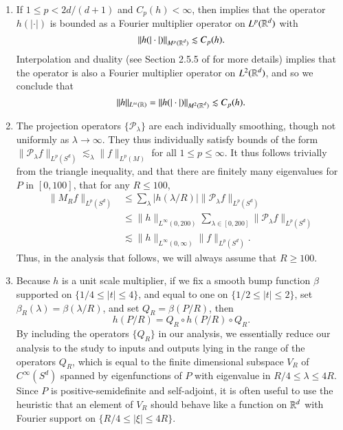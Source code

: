 \begin{remarks}
    \ 
\begin{enumerate}
    \item If $1 \leq p < 2d/(d+1)$ and $C_p(h) < \infty$, then \cite{HeoandNazarovandSeeger} implies that the operator $h(|\cdot|)$ is bounded as a Fourier multiplier operator on $L^p(\operatorname{\mathbb{R}}^d)$ with
    \[ \| h(|\cdot|) \|_{M^p(\operatorname{\mathbb{R}}^d)} \lesssim C_p(h). \]
    Interpolation and duality (see Section 2.5.5 of \cite{Grafakos} for more details) implies that the operator is also a Fourier multiplier operator on $L^2(\operatorname{\mathbb{R}}^d)$, and so we conclude that
    \[ \| h \|_{L^\infty(\operatorname{\mathbb{R}})} = \| h( |\cdot| ) \|_{M^2(\operatorname{\mathbb{R}}^d)} \lesssim C_p(h). \]

    \item The projection operators $\{ \mathcal{P}_\lambda \}$ are each individually smoothing, though not uniformly as $\lambda \to \infty$. They thus individually satisfy bounds of the form $\| \mathcal{P}_\lambda f \|_{L^p(S^d)} \lesssim_\lambda \| f \|_{L^p(M)}$ for all $1 \leq p \leq \infty$. It thus follows trivially from the triangle inequality, and that there are finitely many eigenvalues for $P$ in $[0,100]$, that for any $R \leq 100$,
    \begin{align*}
        \| M_R f \|_{L^p(S^d)} &\leq \sum_\lambda |h(\lambda/R)| \| \mathcal{P}_\lambda f \|_{L^p(S^d)}\\
        &\leq \| h \|_{L^\infty(0,200)} \sum\nolimits_{\lambda \in [0,200]} \| \mathcal{P}_\lambda f \|_{L^p(S^d)}\\
        &\lesssim \| h \|_{L^\infty(0,\infty)} \| f \|_{L^p(S^d)}.
    \end{align*}
    Thus, in the analysis that follows, we will always assume that $R \geq 100$.

    \item Because $h$ is a unit scale multiplier, if we fix a smooth bump function $\beta$ supported on $\{ 1/4 \leq |t| \leq 4 \}$, and equal to one on $\{ 1/2 \leq |t| \leq 2 \}$, set $\beta_R(\lambda) = \beta(\lambda / R)$, and set $Q_R = \beta(P/R)$, then
    \[ h(P/R) = Q_R \circ h(P/R) \circ Q_R. \]
    By including the operators $\{ Q_R \}$ in our analysis, we essentially reduce our analysis to the study to inputs and outputs lying in the range of the operators $Q_R$, which is equal to the finite dimensional subspace $V_R$ of $C^\infty(S^d)$ spanned by eigenfunctions of $P$ with eigenvalue in $R/4 \leq \lambda \leq 4R$. Since $P$ is positive-semidefinite and self-adjoint, it is often useful to use the heuristic that an element of $V_R$ should behave like a function on $\operatorname{\mathbb{R}}^d$ with Fourier support on $\{ R/4 \leq |\xi| \leq 4R \}$.


\end{enumerate}
\end{remarks}
